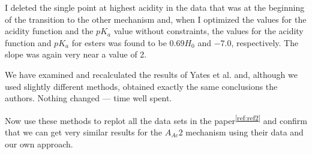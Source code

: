 \documentclass[]{tufte-handout}
\begin{document}
I deleted the single point at highest acidity in the data that was at the beginning of the transition to the other mechanism and, when I optimized the values for the acidity function and the $pK_a$ value without constraints, the values for the acidity function and $pK_a$ for esters was found to be $0.69H_0$ and $-7.0$, respectively. The slope was again very near a value of 2. 

We have examined and recalculated the results of Yates et al. and, although we used slightly different methods, obtained exactly the same conclusions the authors. Nothing changed --- time well spent.

Now use these methods to replot all the data sets in the paper\textsuperscript{\ref{ref:ref2}} and confirm that we can get very similar results for the $A_{Ac}2$ mechanism using their data and our own approach.
\end{document}
